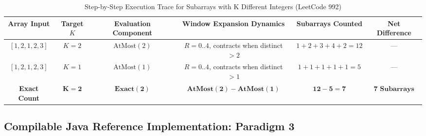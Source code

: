 \documentclass[10pt,journal,compsoc,onecolumn]{IEEEtran}
\begin{document}
\begin{table}[htbp]
\caption{Step-by-Step Execution Trace for Subarrays with K Different Integers (LeetCode 992)}
\label{tab:trace_lc992}
\centering
\begin{tabular}{cccccc}
\toprule
\textbf{Array Input} & \textbf{Target $K$} & \textbf{Evaluation Component} & \textbf{Window Expansion Dynamics} & \textbf{Subarrays Counted} & \textbf{Net Difference} \\
\midrule
$[1, 2, 1, 2, 3]$ & $K = 2$ & $\text{AtMost}(2)$ & $R=0..4$, contracts when distinct $> 2$ & $1+2+3+4+2 = 12$ & --- \\
$[1, 2, 1, 2, 3]$ & $K = 1$ & $\text{AtMost}(1)$ & $R=0..4$, contracts when distinct $> 1$ & $1+1+1+1+1 = 5$ & --- \\
\midrule
\textbf{Exact Count} & $\mathbf{K = 2}$ & $\mathbf{\text{Exact}(2)}$ & $\mathbf{\text{AtMost}(2) - \text{AtMost}(1)}$ & $\mathbf{12 - 5 = 7}$ & $\mathbf{7 \text{ Subarrays}}$ \\
\bottomrule
\end{tabular}
\end{table}

\subsection{Compilable Java Reference Implementation: Paradigm 3}
\end{document}

